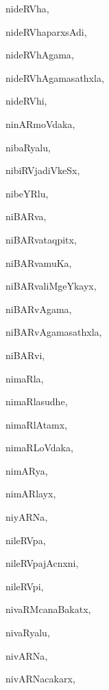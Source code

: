 \begin{multicols}{3}
{\noindent
{nideRVha}, \pageref{nideRVha}

\noindent
{nideRVhaparxsAdi}, \pageref{nideRVhaparxsAdi}

\noindent
{nideRVhAgama}, \pageref{nideRVhAgama}

\noindent
{nideRVhAgamasathxla}, \pageref{nideRVhAgamasathxla}

\noindent
{nideRVhi}, \pageref{nideRVhi}

\noindent
{ninARmoVdaka}, \pageref{ninARmoVdaka}

\noindent
{nibaRyalu}, \pageref{nibaRyalu}

\noindent
{nibiRVjadiVkeSx}, \pageref{nibiRVjadiVkeSx}

\noindent
{nibeYRlu}, \pageref{nibeYRlu}

\noindent
{niBARva}, \pageref{niBARva}

\noindent
{niBARvataqpitx}, \pageref{niBARvataqpitx}

\noindent
{niBARvamuKa}, \pageref{niBARvamuKa}

\noindent
{niBARvaliMgeYkayx}, \pageref{niBARvaliMgeYkayx}

\noindent
{niBARvAgama}, \pageref{niBARvAgama}

\noindent
{niBARvAgamasathxla}, \pageref{niBARvAgamasathxla}

\noindent
{niBARvi}, \pageref{niBARvi}

\noindent
{nimaRla}, \pageref{nimaRla}

\noindent
{nimaRlasudhe}, \pageref{nimaRlasudhe}

\noindent
{nimaRlAtamx}, \pageref{nimaRlAtamx}

\noindent
{nimaRLoVdaka}, \pageref{nimaRLoVdaka}

\noindent
{nimARya}, \pageref{nimARya}

\noindent
{nimARlayx}, \pageref{nimARlayx}

\noindent
{niyARNa}, \pageref{niyARNa}

\noindent
{nileRVpa}, \pageref{nileRVpa}

\noindent
{nileRVpajAcnxni}, \pageref{nileRVpajAcnxni}

\noindent
{nileRVpi}, \pageref{nileRVpi}

\noindent
{nivaRMcanaBakatx}, \pageref{nivaRMcanaBakatx}

\noindent
{nivaRyalu}, \pageref{nivaRyalu}

\noindent
{nivARNa}, \pageref{nivARNa}

\noindent
{nivARNacakarx}, \pageref{nivARNacakarx}

}
\end{multicols}
